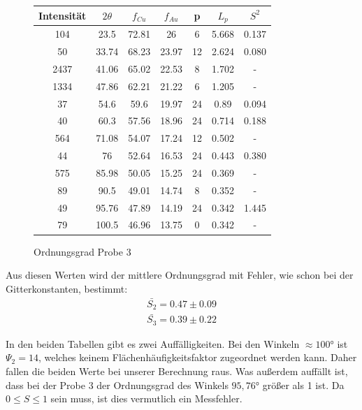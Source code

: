                 \begin{figure}[H]
                    \centering
                    \begin{tabular}{c | c | c | c | c | c | c}
                        Intensität & $2\theta$ & $f_{Cu}$ & $f_{Au}$ & p & $L_p$ & $S^2$\\
                        \hline
                        104 & 23.5 & 72.81 & 26 & 6 & 5.668 & 0.137\\
                        50 & 33.74 & 68.23 & 23.97 & 12 & 2.624 & 0.080\\
                        2437 & 41.06 & 65.02 & 22.53 & 8 & 1.702 & - \\
                        1334 & 47.86 & 62.21 & 21.22 & 6 & 1.205 & - \\
                        37 & 54.6 & 59.6 & 19.97 & 24 & 0.89 & 0.094\\
                        40 & 60.3 & 57.56 & 18.96 & 24 & 0.714 & 0.188\\
                        564 & 71.08 & 54.07 & 17.24 & 12 & 0.502 & - \\
                        44 & 76 & 52.64 & 16.53 & 24 & 0.443 & 0.380\\
                        575 & 85.98 & 50.05 & 15.25 & 24 & 0.369 &  -\\
                        89 & 90.5 & 49.01 & 14.74 & 8 & 0.352 &  -\\
                        49 & 95.76 & 47.89 & 14.19 & 24 & 0.342 & 1.445\\
                        79 & 100.5 & 46.96 & 13.75 & 0 & 0.342 & - \\
                    \end{tabular}
                    \caption{Ordnungsgrad Probe 3}
                \end{figure}

                Aus diesen Werten wird der mittlere Ordnungsgrad mit Fehler, wie schon bei der Gitterkonstanten, 
                bestimmt:
                \begin{align}
                    \bar{S_2} = 0.47 \pm 0.09\\
                    \bar{S_3} = 0.39 \pm 0.22
                \end{align}

                In den beiden Tabellen gibt es zwei Auffälligkeiten. Bei den Winkeln $\approx 100$°
                ist $\Psi_2 = 14$, welches keinem Flächenhäufigkeitsfaktor zugeordnet werden kann. Daher fallen
                die beiden Werte bei unserer Berechnung raus. Was außerdem auffällt ist, dass bei der Probe 3 
                der Ordnungsgrad des Winkels $95,76$° größer als 1 ist. Da $0 \leq S \leq 1$ sein muss, ist dies 
                vermutlich ein Messfehler.
            


